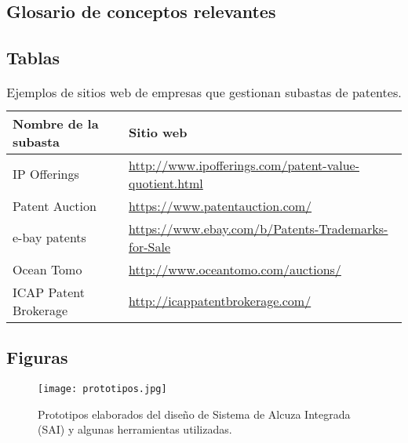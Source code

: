\subsection{Glosario de conceptos relevantes }
\label{glosario}


\newpage
\subsection{Tablas}
\begin{table}[hb]
\centering
\begin{tabular}{|l|l|}
\hline
\rowcolor[HTML]{DDEBF7}
Nombre de la subasta  & Sitio web                                                                    \\ \hline
IP Offerings          & \url{http://www.ipofferings.com/patent-value-quotient.html}                \\ \hline
Patent Auction        & \url{https://www.patentauction.com/}                                       \\ \hline
e-bay patents         & \url{https://www.ebay.com/b/Patents-Trademarks-for-Sale} \\ \hline
Ocean Tomo            & \url{http://www.oceantomo.com/auctions/}                                   \\ \hline
ICAP Patent Brokerage & \url{http://icappatentbrokerage.com/}                                      \\ \hline
\end{tabular}
\caption{Ejemplos de sitios web de empresas que gestionan subastas de patentes.}
\label{sitios_de_subastas}
\end{table}
\newpage
\subsection{Figuras}
\label{anexo:figuras}
\begin{figure}[hb]
  \centering
  \texttt{[image: prototipos.jpg]}
  \label{foto_prototipos}
  \caption{Prototipos elaborados del diseño de Sistema de Alcuza Integrada (SAI) y algunas herramientas utilizadas.}
\end{figure}

